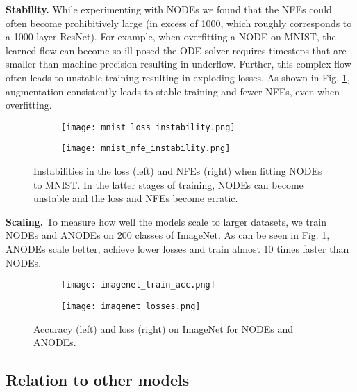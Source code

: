\documentclass{article}
\begin{document}
\textbf{Stability.} While experimenting with NODEs we found that the NFEs could often become prohibitively large (in excess of 1000, which roughly corresponds to a 1000-layer ResNet). For example, when overfitting a NODE on MNIST, the learned flow can become so ill posed the ODE solver requires timesteps that are smaller than machine precision resulting in underflow. Further, this complex flow often leads to unstable training resulting in exploding losses. As shown in Fig. \ref{instability-fig}, augmentation consistently leads to stable training and fewer NFEs, even when overfitting.


\begin{figure}[b]
\centering
\begin{subfigure}[t]{0.36\linewidth}
\centering
\texttt{[image: mnist\_loss\_instability.png]}
\end{subfigure}
\begin{subfigure}[t]{0.36\linewidth}
\centering
\texttt{[image: mnist\_nfe\_instability.png]}
\end{subfigure}
\setlength{\abovecaptionskip}{-1pt}
\setlength{\belowcaptionskip}{-5pt}
\caption{Instabilities in the loss (left) and NFEs (right) when fitting NODEs to MNIST. In the latter stages of training, NODEs can become unstable and the loss and NFEs become erratic.}
\label{instability-fig}
\end{figure}

\textbf{Scaling.} To measure how well the models scale to larger datasets, we train NODEs and ANODEs on 200 classes of  ImageNet. As can be seen in Fig. \ref{instability-fig}, ANODEs scale better, achieve lower losses and train almost 10 times faster than NODEs.

\begin{figure}[t]
\centering
\begin{subfigure}[t]{0.34\linewidth}
\centering
\texttt{[image: imagenet\_train\_acc.png]}
\end{subfigure}
\begin{subfigure}[t]{0.34\linewidth}
\centering
\texttt{[image: imagenet\_losses.png]}
\end{subfigure}
\setlength{\abovecaptionskip}{-1pt}
\setlength{\belowcaptionskip}{-5pt}
\caption{Accuracy (left) and loss (right) on  ImageNet for NODEs and ANODEs.}
\label{imagenet-tests}
\end{figure}

\subsection{Relation to other models}
\end{document}
